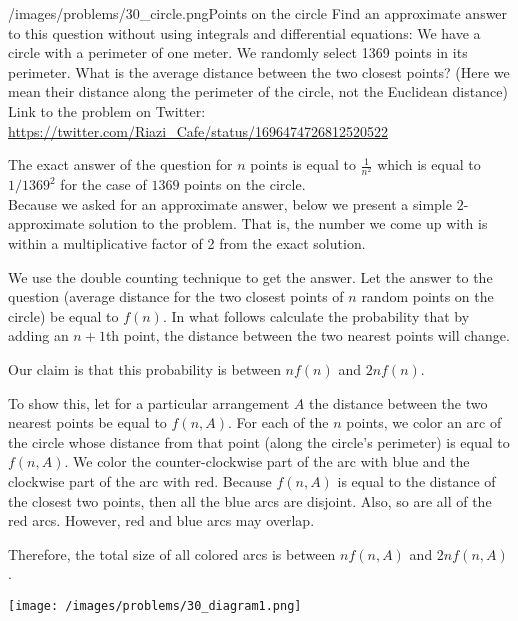 \begin{problem}{/images/problems/30_circle.png}{Points on the circle}
	Find an approximate answer to this question without using integrals and differential equations:
We have a circle with a perimeter of one meter. We randomly select 1369 points in its perimeter. What is the average distance between the two closest points? (Here we mean their distance along the perimeter of the circle, not the Euclidean distance)\\[0.2cm]

Link to the problem on Twitter:  \url{https://twitter.com/Riazi_Cafe/status/1696474726812520522}
\end{problem}
\begin{solution}
The exact answer of the question for $n$ points is equal to $\frac{1}{n^2}$ which is equal to $1/1369^2$ for the case of $1369$ points on the circle.\\[0.2cm]

Because we asked for an approximate answer, below we present a simple $2$-approximate solution to the problem. That is, the number we come up with is within a multiplicative factor of 2 from the exact solution.

We use the double counting technique to get the answer. Let the answer to the question (average distance for the two closest points of $n$ random points on the circle) be equal to $f(n)$. In what follows calculate the probability that by adding an $n+1$th point, the distance between the two nearest points will change.

Our claim is that this probability is between $nf(n)$ and $2nf(n)$.

To show this, let for a particular arrangement $A$ the distance between the two nearest points be equal to $f(n,A)$.
For each of the $n$ points, we color an arc of the circle whose distance from that point (along the circle's perimeter) is equal to $f(n,A)$.
We color the counter-clockwise part of the arc with blue and the clockwise part of the arc with red.
Because $f(n,A)$ is equal to the distance of the closest two points, then all the blue arcs are disjoint.
Also, so are all of the red arcs.
However, red and blue arcs may overlap.

Therefore, the total size of all colored arcs is between
$nf(n,A)$
and
$2nf(n,A)$.

\begin{center}
	\texttt{[image: /images/problems/30\_diagram1.png]}
\end{center}


\end{solution}
